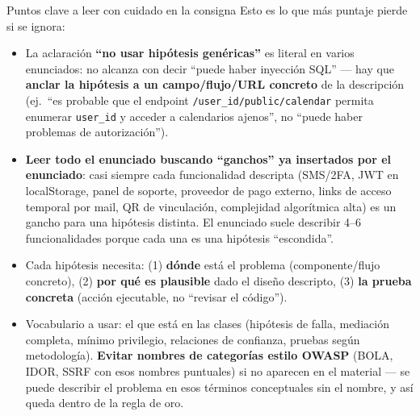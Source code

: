 \begin{warnbox}{Puntos clave a leer con cuidado en la consigna}
Esto es lo que más puntaje pierde si se ignora:
\begin{itemize}
  \item La aclaración \textbf{``no usar hipótesis genéricas''} es literal en varios
  enunciados: no alcanza con decir ``puede haber inyección SQL'' --- hay que
  \textbf{anclar la hipótesis a un campo/flujo/URL concreto} de la descripción (ej.\ ``es
  probable que el endpoint \texttt{/user\_id/public/calendar} permita enumerar
  \texttt{user\_id} y acceder a calendarios ajenos'', no ``puede haber problemas de
  autorización'').
  \item \textbf{Leer todo el enunciado buscando ``ganchos'' ya insertados por el
  enunciado}: casi siempre cada funcionalidad descripta (SMS/2FA, JWT en localStorage,
  panel de soporte, proveedor de pago externo, links de acceso temporal por mail, QR de
  vinculación, complejidad algorítmica alta) es un gancho para una hipótesis distinta. El
  enunciado suele describir 4--6 funcionalidades porque cada una es una hipótesis
  ``escondida''.
  \item Cada hipótesis necesita: (1) \textbf{dónde} está el problema (componente/flujo
  concreto), (2) \textbf{por qué es plausible} dado el diseño descripto, (3) \textbf{la
  prueba concreta} (acción ejecutable, no ``revisar el código'').
  \item Vocabulario a usar: el que está en las clases (hipótesis de falla, mediación
  completa, mínimo privilegio, relaciones de confianza, pruebas según metodología).
  \textbf{Evitar nombres de categorías estilo OWASP} (BOLA, IDOR, SSRF con esos nombres
  puntuales) si no aparecen en el material --- se puede describir el problema en esos
  términos conceptuales sin el nombre, y así queda dentro de la regla de oro.
\end{itemize}
\end{warnbox}

